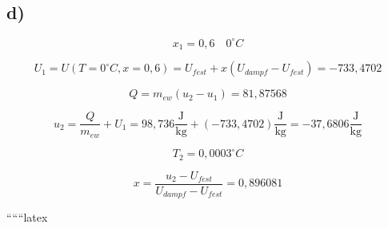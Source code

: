 

\subsection*{d)}

\[
x_1 = 0,6 \quad 0^\circ C
\]

\[
U_1 = U(T=0^\circ C, x=0,6) = U_{fest} + x (U_{dampf} - U_{fest}) = -733,4702
\]

\[
Q = m_{ew} (u_2 - u_1) = 81,87568
\]

\[
u_2 = \frac{Q}{m_{ew}} + U_1 = 98,736 \frac{\text{J}}{\text{kg}} + (-733,4702) \frac{\text{J}}{\text{kg}} = -37,6806 \frac{\text{J}}{\text{kg}}
\]

\[
T_2 = 0,0003^\circ C
\]

\[
x = \frac{u_2 - U_{fest}}{U_{dampf} - U_{fest}} = 0,896081
\]

``````latex